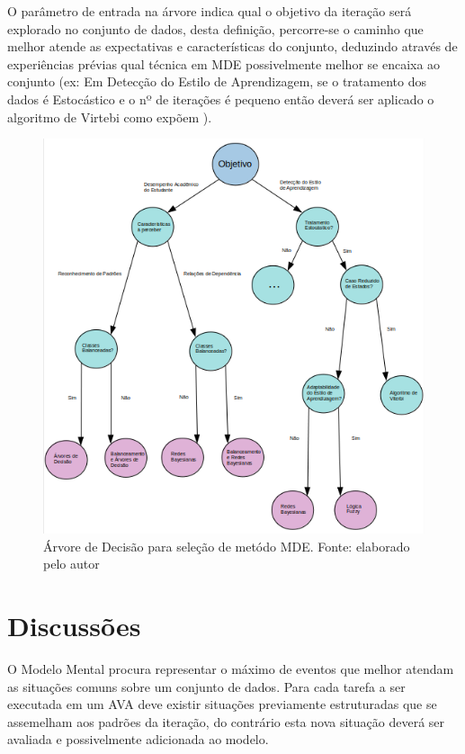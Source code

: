 \documentclass[12pt]{article}
\begin{document}
O parâmetro de entrada na árvore indica qual o objetivo da iteração será explorado no conjunto de dados, desta definição, percorre-se o caminho que melhor atende as expectativas e características do conjunto, deduzindo através de experiências prévias qual técnica em MDE possivelmente melhor se encaixa ao conjunto (ex: Em Detecção do Estilo de Aprendizagem, se o tratamento dos dados é Estocástico e o nº de iterações é pequeno então deverá ser aplicado o algoritmo de Virtebi como expõem \cite{Sena_etal_2016}). 


\begin{figure}[H]
	\centering
	\includegraphics[scale=0.85]{figuras/ArvoreDecisao}
	\caption{Árvore de Decisão para seleção de metódo MDE. Fonte: elaborado pelo autor }
	\label{arvoreDecisao}	
\end{figure}

\section{Discussões}

O Modelo Mental procura representar o máximo de eventos que melhor atendam as situações comuns sobre um conjunto de dados. Para cada tarefa a ser executada em um AVA deve existir situações previamente estruturadas que se assemelham aos padrões da iteração, do contrário esta nova situação deverá ser avaliada e possivelmente adicionada ao modelo.
\end{document}
